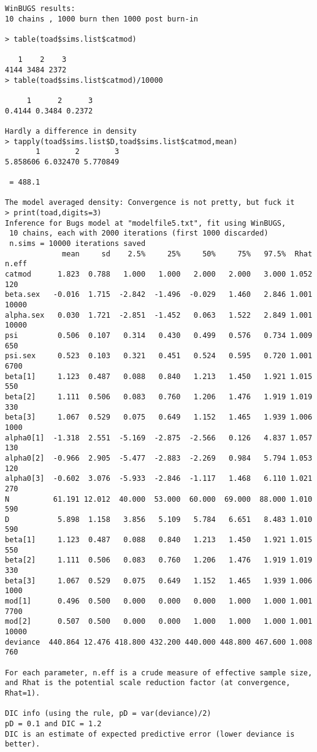 \begin{verbatim}
WinBUGS results:
10 chains , 1000 burn then 1000 post burn-in

> table(toad$sims.list$catmod)

   1    2    3 
4144 3484 2372 
> table(toad$sims.list$catmod)/10000

     1      2      3 
0.4144 0.3484 0.2372 

Hardly a difference in density
> tapply(toad$sims.list$D,toad$sims.list$catmod,mean)
       1        2        3 
5.858606 6.032470 5.770849 

 = 488.1

The model averaged density: Convergence is not pretty, but fuck it
> print(toad,digits=3)
Inference for Bugs model at "modelfile5.txt", fit using WinBUGS,
 10 chains, each with 2000 iterations (first 1000 discarded)
 n.sims = 10000 iterations saved
             mean     sd    2.5%     25%     50%     75%   97.5%  Rhat n.eff
catmod      1.823  0.788   1.000   1.000   2.000   2.000   3.000 1.052   120
beta.sex   -0.016  1.715  -2.842  -1.496  -0.029   1.460   2.846 1.001 10000
alpha.sex   0.030  1.721  -2.851  -1.452   0.063   1.522   2.849 1.001 10000
psi         0.506  0.107   0.314   0.430   0.499   0.576   0.734 1.009   650
psi.sex     0.523  0.103   0.321   0.451   0.524   0.595   0.720 1.001  6700
beta[1]     1.123  0.487   0.088   0.840   1.213   1.450   1.921 1.015   550
beta[2]     1.111  0.506   0.083   0.760   1.206   1.476   1.919 1.019   330
beta[3]     1.067  0.529   0.075   0.649   1.152   1.465   1.939 1.006  1000
alpha0[1]  -1.318  2.551  -5.169  -2.875  -2.566   0.126   4.837 1.057   130
alpha0[2]  -0.966  2.905  -5.477  -2.883  -2.269   0.984   5.794 1.053   120
alpha0[3]  -0.602  3.076  -5.933  -2.846  -1.117   1.468   6.110 1.021   270
N          61.191 12.012  40.000  53.000  60.000  69.000  88.000 1.010   590
D           5.898  1.158   3.856   5.109   5.784   6.651   8.483 1.010   590
beta[1]     1.123  0.487   0.088   0.840   1.213   1.450   1.921 1.015   550
beta[2]     1.111  0.506   0.083   0.760   1.206   1.476   1.919 1.019   330
beta[3]     1.067  0.529   0.075   0.649   1.152   1.465   1.939 1.006  1000
mod[1]      0.496  0.500   0.000   0.000   0.000   1.000   1.000 1.001  7700
mod[2]      0.507  0.500   0.000   0.000   1.000   1.000   1.000 1.001 10000
deviance  440.864 12.476 418.800 432.200 440.000 448.800 467.600 1.008   760

For each parameter, n.eff is a crude measure of effective sample size,
and Rhat is the potential scale reduction factor (at convergence, Rhat=1).

DIC info (using the rule, pD = var(deviance)/2)
pD = 0.1 and DIC = 1.2
DIC is an estimate of expected predictive error (lower deviance is better).
\end{verbatim}

